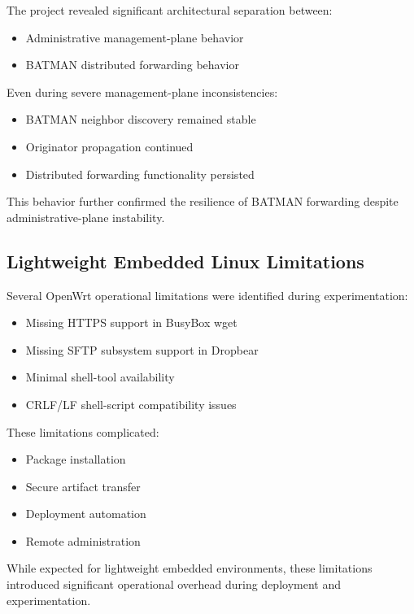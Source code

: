 \documentclass[conference]{IEEEtran}
\begin{document}
The project revealed significant architectural separation between:

\begin{itemize}
    \item Administrative management-plane behavior
    \item BATMAN distributed forwarding behavior
\end{itemize}

Even during severe management-plane inconsistencies:

\begin{itemize}
    \item BATMAN neighbor discovery remained stable
    \item Originator propagation continued
    \item Distributed forwarding functionality persisted
\end{itemize}

This behavior further confirmed the resilience of BATMAN forwarding despite administrative-plane instability.

\subsection{Lightweight Embedded Linux Limitations}

Several OpenWrt operational limitations were identified during experimentation:

\begin{itemize}
    \item Missing HTTPS support in BusyBox wget
    \item Missing SFTP subsystem support in Dropbear
    \item Minimal shell-tool availability
    \item CRLF/LF shell-script compatibility issues
\end{itemize}

These limitations complicated:
\begin{itemize}
    \item Package installation
    \item Secure artifact transfer
    \item Deployment automation
    \item Remote administration
\end{itemize}

While expected for lightweight embedded environments, these limitations introduced significant operational overhead during deployment and experimentation.
\end{document}

